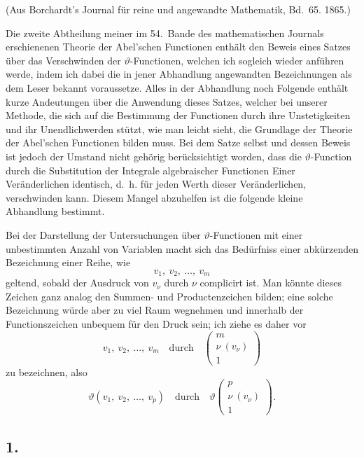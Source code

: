 \documentclass[12pt,a4paper]{article}
\begin{document}
\begin{center}
(Aus Borchardt's Journal für reine und angewandte Mathematik, Bd.~65. 1865.)
\end{center}

Die zweite Abtheilung meiner im 54.~Bande des mathematischen Journals erschienenen Theorie der Abel'schen Functionen enthält den Beweis eines Satzes über das Verschwinden der $\vartheta$-Functionen, welchen ich sogleich wieder anführen werde, indem ich dabei die in jener Abhandlung angewandten Bezeichnungen als dem Leser bekannt voraussetze. Alles in der Abhandlung noch Folgende enthält kurze Andeutungen über die Anwendung dieses Satzes, welcher bei unserer Methode, die sich auf die Bestimmung der Functionen durch ihre Unstetigkeiten und ihr Unendlichwerden stützt, wie man leicht sieht, die Grundlage der Theorie der Abel'schen Functionen bilden muss. Bei dem Satze selbst und dessen Beweis ist jedoch der Umstand nicht gehörig berücksichtigt worden, dass die $\vartheta$-Function durch die Substitution der Integrale algebraischer Functionen Einer Veränderlichen identisch, d.~h. für jeden Werth dieser Veränderlichen, verschwinden kann. Diesem Mangel abzuhelfen ist die folgende kleine Abhandlung bestimmt.

Bei der Darstellung der Untersuchungen über $\vartheta$-Functionen mit einer unbestimmten Anzahl von Variablen macht sich das Bedürfniss einer abkürzenden Bezeichnung einer Reihe, wie
\[ v_1,\ v_2,\ \ldots,\ v_m \]
geltend, sobald der Ausdruck von $v_\nu$ durch $\nu$ complicirt ist. Man könnte dieses Zeichen ganz analog den Summen- und Productenzeichen bilden; eine solche Bezeichnung würde aber zu viel Raum wegnehmen und innerhalb der Functionszeichen unbequem für den Druck sein; ich ziehe es daher vor
\[ v_1,\ v_2,\ \ldots,\ v_m \quad\text{durch}\quad \left(\begin{array}{c} m\\ \nu\ (v_\nu)\\ 1 \end{array}\right) \]
zu bezeichnen, also
\[ \vartheta(v_1,\ v_2,\ \ldots,\ v_p) \quad\text{durch}\quad \vartheta\left(\begin{array}{c} p\\ \nu\ (v_\nu)\\ 1 \end{array}\right). \]

\subsection*{1.}
\end{document}
